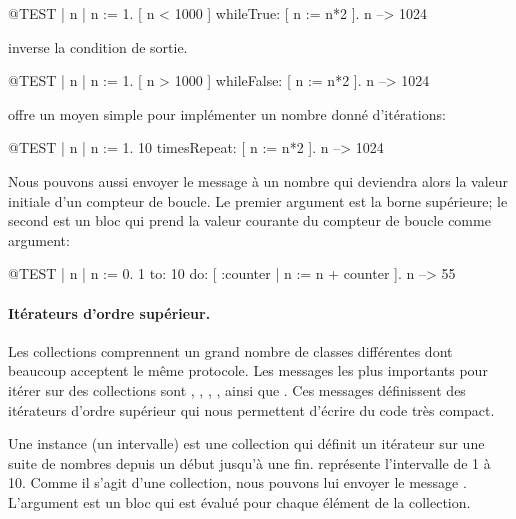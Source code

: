 \documentclass[a4paper,10pt,twoside]{book}
\begin{document}
\begin{code}{@TEST | n |}
n := 1.
[ n < 1000 ] whileTrue: [ n := n*2 ].
n --> 1024
\end{code}

\noindent
{} inverse la condition de sortie.

\begin{code}{@TEST | n |}
n := 1.
[ n > 1000 ] whileFalse: [ n := n*2 ].
n --> 1024
\end{code}

\noindent
{} offre un moyen simple pour impl\'{e}menter un nombre donn\'{e} d'it\'{e}rations:
\begin{code}{@TEST | n |}
n := 1.
10 timesRepeat: [ n := n*2 ].
n --> 1024
\end{code}
Nous pouvons aussi envoyer le message  \`{a} un
nombre qui deviendra alors la valeur initiale d'un compteur de boucle.
Le premier argument est la borne sup\'{e}rieure; le second est un bloc qui prend la valeur courante du compteur de boucle comme argument:

\begin{code}{@TEST | n |}
n := 0.
1 to: 10 do: [ :counter | n := n + counter ].
n --> 55
\end{code}

\paragraph{It\'erateurs d'ordre sup\'erieur.}

Les collections comprennent un grand nombre de classes diff\'{e}rentes
dont beaucoup acceptent le m\^{e}me protocole.
Les messages les plus importants pour it\'{e}rer sur des collections 
sont 
, , , ,  ainsi que  .
Ces messages d\'{e}finissent des it\'{e}rateurs d'ordre sup\'erieur qui nous permettent d'\'{e}crire du code tr\`{e}s compact.

Une instance  (\ie un intervalle) est une collection qui d\'{e}finit un it\'{e}rateur sur une suite de nombres depuis un d\'{e}but jusqu'\`{a} une fin.
 repr\'{e}sente l'intervalle de 1 \`{a} 10.
Comme il s'agit d'une collection, nous pouvons lui envoyer le message .
L'argument est un bloc qui est \'{e}valu\'{e} pour chaque \'{e}l\'{e}ment de la collection.
\end{document}
